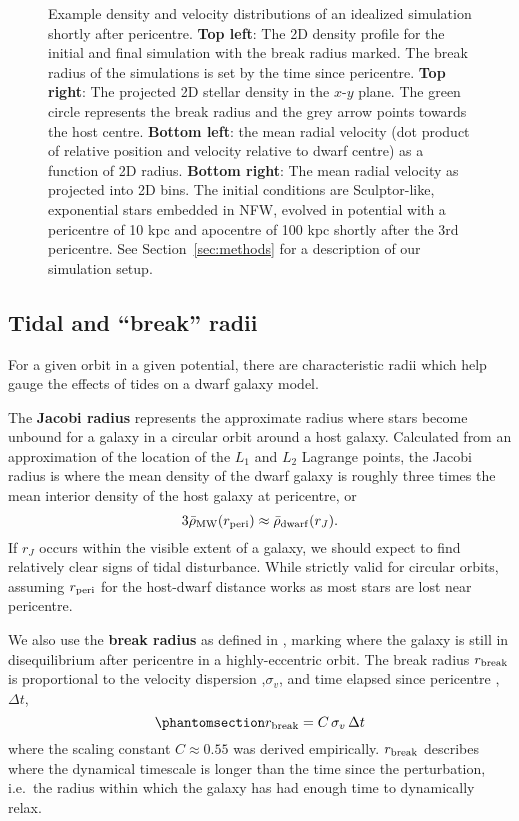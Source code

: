 \begin{figure}
\centering
{}
\caption[Break radius validation]{Example density and velocity
distributions of an idealized simulation shortly after pericentre.
\textbf{Top left}: The 2D density profile for the initial and final
simulation with the break radius marked. The break radius of the
simulations is set by the time since pericentre. \textbf{Top right}: The
projected 2D stellar density in the \(x\)-\(y\) plane. The green circle
represents the break radius and the grey arrow points towards the host
centre. \textbf{Bottom left}: the mean radial velocity (dot product of
relative position and velocity relative to dwarf centre) as a function
of 2D radius. \textbf{Bottom right}: The mean radial velocity as
projected into 2D bins. The initial conditions are Sculptor-like,
exponential stars embedded in NFW, evolved in \citet{EP2020} potential
with a pericentre of 10 kpc and apocentre of 100 kpc shortly after the
3rd pericentre. See Section~\ref{sec:methods} for a description of our
simulation setup.}\label{fig:idealized_break_radius}
\end{figure}

\subsection{Tidal and ``break'' radii}\label{sec:break_radii}

For a given orbit in a given potential, there are characteristic radii
which help gauge the effects of tides on a dwarf galaxy model.

The \textbf{Jacobi radius} represents the approximate radius where stars
become unbound for a galaxy in a circular orbit around a host galaxy.
Calculated from an approximation of the location of the \(L_1\) and
\(L_2\) Lagrange points, the Jacobi radius is where the mean density of
the dwarf galaxy is roughly three times the mean interior density of the
host galaxy at pericentre, or \begin{equation}{
3\bar \rho_{\rm MW}(r_{\rm peri}) \approx \bar \rho_{\rm dwarf}(r_J).
}\end{equation} If \(r_J\) occurs within the visible extent of a galaxy,
we should expect to find relatively clear signs of tidal disturbance.
While strictly valid for circular orbits, assuming \(r_{\rm peri}\) for
the host-dwarf distance works as most stars are lost near pericentre.

We also use the \textbf{break radius} as defined in
\citet{penarrubia+2009}, marking where the galaxy is still in
disequilibrium after pericentre in a highly-eccentric orbit. The break
radius \(r_{\rm break}\) is proportional to the velocity dispersion
,\(\sigma_v\), and time elapsed since pericentre ,\(\Delta t\),
\begin{equation}\protect\phantomsection\label{eq:r_break}{
r_{\rm break} = C\,\sigma_{v}\,\Delta t
}\end{equation} where the scaling constant \(C \approx 0.55\) was
derived empirically. \(r_{\rm break}\) describes where the dynamical
timescale is longer than the time since the perturbation, i.e.~the
radius within which the galaxy has had enough time to dynamically relax.

